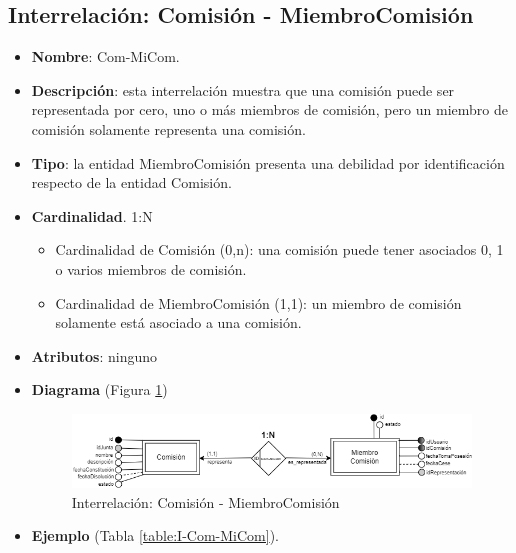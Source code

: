 \subsection{Interrelación: Comisión - MiembroComisión}
\begin{itemize}
    \item \textbf{Nombre}: Com-MiCom.
    \item \textbf{Descripción}: esta interrelación muestra que una comisión puede ser representada por cero, uno o más miembros de comisión, pero un miembro de comisión solamente representa una comisión.
    \item \textbf{Tipo}: la entidad MiembroComisión presenta una debilidad por identificación respecto de la entidad Comisión.
    \item \textbf{Cardinalidad}. 1:N
    \begin{itemize}
        \item Cardinalidad de Comisión (0,n): una comisión puede tener asociados 0, 1 o varios miembros de comisión.
        \item Cardinalidad de MiembroComisión (1,1): un miembro de comisión solamente está asociado a una comisión.
    \end{itemize}
    \item \textbf{Atributos}: ninguno
    \item \textbf{Diagrama} (Figura \ref{fig:I-Com-MiCom}) 
    \begin{figure}[H]
        \centering
        \includegraphics[scale=0.7]{img/diagramas/EER/I-Com-MiCom}
        \caption{Interrelación: Comisión - MiembroComisión}
        \label{fig:I-Com-MiCom}
    \end{figure}
    
    \item \textbf{Ejemplo} (Tabla \ref{table:I-Com-MiCom}).


\end{itemize}
